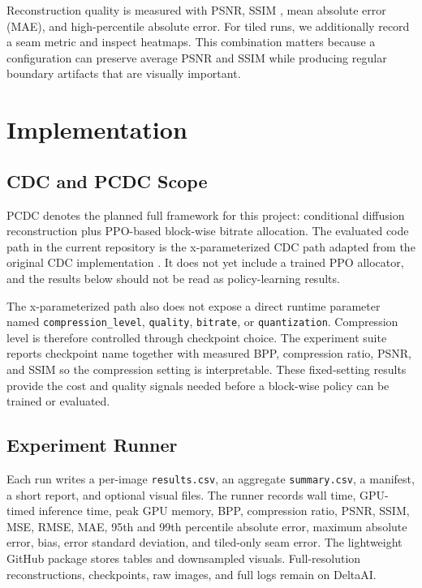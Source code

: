 \documentclass[conference]{IEEEtran}
\begin{document}
Reconstruction quality is measured with PSNR, SSIM \cite{wang2004ssim}, mean absolute error (MAE), and high-percentile absolute error. For tiled runs, we additionally record a seam metric and inspect heatmaps. This combination matters because a configuration can preserve average PSNR and SSIM while producing regular boundary artifacts that are visually important.

\section{Implementation}

\subsection{CDC and PCDC Scope}

PCDC denotes the planned full framework for this project: conditional diffusion reconstruction plus PPO-based block-wise bitrate allocation. The evaluated code path in the current repository is the x-parameterized CDC path adapted from the original CDC implementation \cite{yang2022lossy}. It does not yet include a trained PPO allocator, and the results below should not be read as policy-learning results.

The x-parameterized path also does not expose a direct runtime parameter named \texttt{compression\_level}, \texttt{quality}, \texttt{bitrate}, or \texttt{quantization}. Compression level is therefore controlled through checkpoint choice. The experiment suite reports checkpoint name together with measured BPP, compression ratio, PSNR, and SSIM so the compression setting is interpretable. These fixed-setting results provide the cost and quality signals needed before a block-wise policy can be trained or evaluated.

\subsection{Experiment Runner}

Each run writes a per-image \texttt{results.csv}, an aggregate \texttt{summary.csv}, a manifest, a short report, and optional visual files. The runner records wall time, GPU-timed inference time, peak GPU memory, BPP, compression ratio, PSNR, SSIM, MSE, RMSE, MAE, 95th and 99th percentile absolute error, maximum absolute error, bias, error standard deviation, and tiled-only seam error. The lightweight GitHub package stores tables and downsampled visuals. Full-resolution reconstructions, checkpoints, raw images, and full logs remain on DeltaAI.
\end{document}
